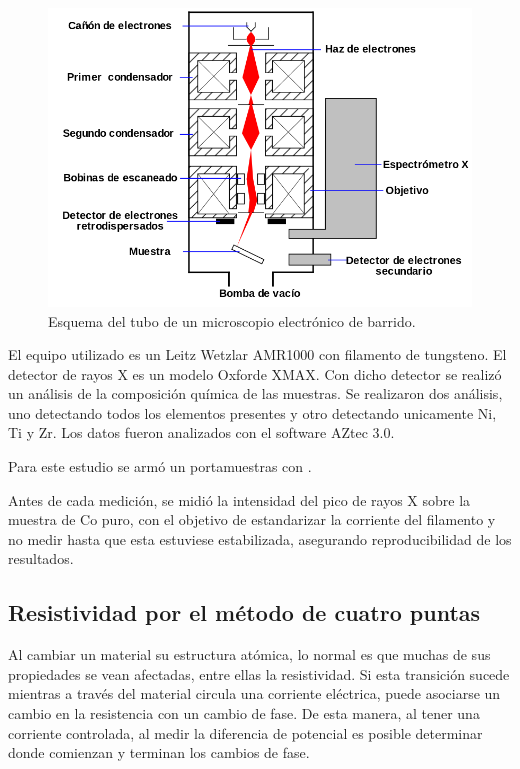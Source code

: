 \documentclass{article}
\theoremstyle{definition}
\theoremstyle{remark}
\begin{document}
 \begin{figure}[H]
 	\centering
	\includegraphics[scale=0.5]{img/SEM.png}
 	\caption{Esquema del tubo de un microscopio electrónico de barrido.}
	\label{SEM}
\end{figure} 

El equipo utilizado es un Leitz Wetzlar AMR1000 con filamento de tungsteno. El detector de rayos X es un modelo Oxforde XMAX. Con dicho detector se realizó un análisis de la composición química de las muestras. Se realizaron dos análisis, uno detectando todos los elementos presentes y otro detectando unicamente Ni, Ti y Zr. Los datos fueron analizados con el software AZtec 3.0.

Para este estudio se armó un portamuestras con .

Antes de cada medición, se midió la intensidad del pico de rayos X sobre la muestra de Co puro, con el objetivo de estandarizar la corriente del filamento y no medir hasta que esta estuviese estabilizada, asegurando reproducibilidad de los resultados.

\subsection{Resistividad por el método de cuatro puntas}
Al cambiar un material su estructura atómica, lo normal es que muchas de sus propiedades se vean afectadas, entre ellas la resistividad. Si esta transición sucede mientras a través del material circula una corriente eléctrica, puede asociarse un cambio en la resistencia con un cambio de fase. De esta manera, al tener una corriente controlada, al medir la diferencia de potencial es posible determinar donde comienzan y terminan los cambios de fase.
\end{document}
